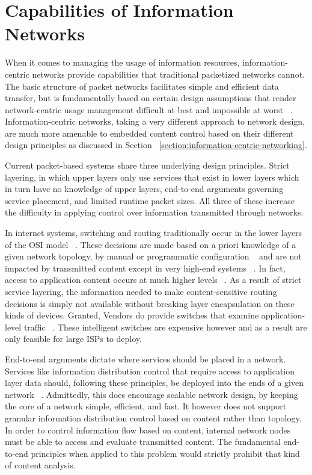 \section{Capabilities of Information Networks}
\label{section:capabilities}
When it comes to managing the usage of information resources,  information-centric networks provide capabilities that traditional packetized networks cannot.  The basic structure of packet networks facilitates simple and efficient data transfer, but is fundamentally based on certain design assumptions that render network-centric usage management difficult at best and impossible at worst ~\cite{Clark:1995:DPD:205447.205458,SaReCl:84}.  Information-centric networks, taking a very different approach to network design, are much more amenable to embedded content control based on their different design principles as discussed in Section ~\ref{section:information-centric-networking}.

Current packet-based systems share three underlying design principles.  Strict layering, in which upper layers only use services that exist in lower layers which in turn have no knowledge of upper layers, end-to-end arguments governing service placement, and limited runtime packet sizes.  All three of these increase the difficulty in applying control over information transmitted through networks.

In internet systems, switching and routing traditionally occur in the lower layers of the OSI model ~\cite{Tanenbaum:1985:CN:536716}.  These decisions are made based on a priori knowledge of a given network topology, by manual or programmatic configuration ~\cite{proposal:openflow} and are not impacted by transmitted content except in very high-end systems ~\cite{cisco-6500}.  In fact, access to application content occurs at much higher levels ~\cite{Tanenbaum:1985:CN:536716}.  As a result of strict service layering, the information needed to make content-sensitive routing decisions is simply not available without breaking layer encapsulation on these kinds of devices.  Granted, Vendors do provide switches that examine application-level traffic ~\cite{cisco-6500}.  These intelligent switches are expensive however and as a result are only feasible for large ISPs to deploy. 

End-to-end arguments dictate where services should be placed in a network.  Services like information distribution control that require access to application layer data should, following these principles, be deployed into the ends of a given network ~\cite{SaReCl:84}.  Admittedly, this does encourage scalable network design, by keeping the core of a network simple, efficient, and fast. It however does not support granular information distribution control based on content rather than topology.  In order to control information flow based on content, internal network nodes must be able to access and evaluate transmitted content.  The fundamental end-to-end principles when applied to this problem would strictly prohibit that kind of content analysis.

